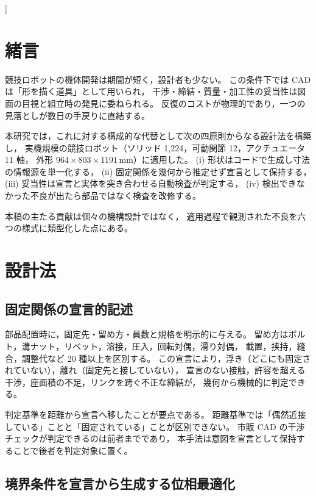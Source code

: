 \documentclass[a4paper,9pt,twocolumn]{ltjsarticle}
\newcommand{\mm}{\ensuremath{\,\mathrm{mm}}}
\begin{document}
]

\section{緒言}

競技ロボットの機体開発は期間が短く，設計者も少ない。
この条件下では CAD は「形を描く道具」として用いられ，
干渉・締結・質量・加工性の妥当性は図面の目視と組立時の発見に委ねられる。
反復のコストが物理的であり，一つの見落としが数日の手戻りに直結する。

本研究では，これに対する構成的な代替として次の四原則からなる設計法を構築し，
実機規模の競技ロボット（ソリッド 1{,}224，可動関節 12，アクチュエータ 11 軸，
外形 $964\times803\times1191\mm$）に適用した。
(i) 形状はコードで生成し寸法の情報源を単一化する，
(ii) 固定関係を幾何から推定せず宣言として保持する，
(iii) 妥当性は宣言と実体を突き合わせる自動検査が判定する，
(iv) 検出できなかった不良が出たら部品ではなく検査を改修する。

本稿の主たる貢献は個々の機構設計ではなく，
適用過程で観測された不良を六つの様式に類型化した点にある。

\section{設計法}

\subsection{固定関係の宣言的記述}

部品配置時に，固定先・留め方・員数と規格を明示的に与える。
留め方はボルト，溝ナット，リベット，溶接，圧入，回転対偶，滑り対偶，
載置，挟持，縫合，調整代など 20 種以上を区別する。
この宣言により，浮き（どこにも固定されていない），離れ（固定先と接していない），
宣言のない接触，許容を超える干渉，座面積の不足，リンクを跨ぐ不正な締結が，
幾何から機械的に判定できる。

判定基準を距離から宣言へ移したことが要点である。
距離基準では「偶然近接している」ことと「固定されている」ことが区別できない。
市販 CAD の干渉チェックが判定できるのは前者までであり，
本手法は意図を宣言として保持することで後者を判定対象に置く。

\subsection{境界条件を宣言から生成する位相最適化}
\end{document}
